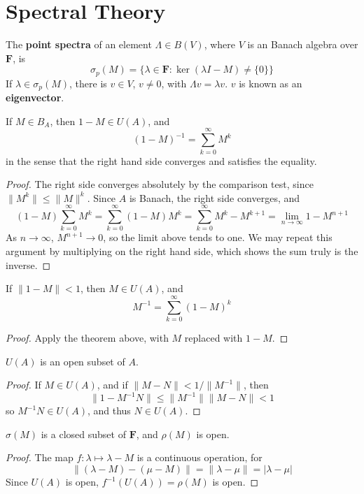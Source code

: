 \section{Spectral Theory}

\begin{definition}
    The {\bf point spectra} of an element $\Lambda \in B(V)$, where $V$ is an Banach algebra over $\mathbf{F}$, is
    \[ \sigma_p(M) = \{ \lambda \in \mathbf{F} : \ker(\lambda I - M) \neq \{ 0 \} \} \]
    If $\lambda \in \sigma_p(M)$, there is $v \in V$, $v \neq 0$, with $\Lambda v = \lambda v$. $v$ is known as an {\bf eigenvector}.
\end{definition}

\begin{lemma}
    If $M \in B_{A}$, then $1 - M \in U(A)$, and
    \[ (1 - M)^{-1} = \sum_{k = 0}^\infty M^k \]
    in the sense that the right hand side converges and satisfies the equality.
\end{lemma}
\begin{proof}
    The right side converges absolutely by the comparison test, since $\| M^k \| \leq \| M \|^k$. Since $A$ is Banach, the right side converges, and
    \[ (1 - M) \sum_{k = 0}^\infty M^k = \sum_{k = 0}^\infty (1 - M)M^k = \sum_{k = 0}^\infty M^k - M^{k+1} = \lim_{n \to \infty} 1 - M^{n+1} \]
    As $n \to \infty$, $M^{n+1} \to 0$, so the limit above tends to one. We may repeat this argument by multiplying on the right hand side, which shows the sum truly is the inverse.
\end{proof}

\begin{corollary}
    If $\| 1 - M \| < 1$, then $M \in U(A)$, and
    \[ M^{-1} = \sum_{k = 0}^\infty (1 - M)^k \]
\end{corollary}
\begin{proof}
    Apply the theorem above, with $M$ replaced with $1 - M$.
\end{proof}

\begin{corollary}
    $U(A)$ is an open subset of $A$.
\end{corollary}
\begin{proof}
    If $M \in U(A)$, and if $\| M - N \| < 1/\| M^{-1} \|$, then 
    \[ \| 1 - M^{-1}N \| \leq \| M^{-1} \| \| M - N \|  < 1 \]
    so $M^{-1}N \in U(A)$, and thus $N \in U(A)$.
\end{proof}

\begin{corollary}
    $\sigma(M)$ is a closed subset of $\mathbf{F}$, and $\rho(M)$ is open.
\end{corollary}
\begin{proof}
    The map $f: \lambda \mapsto \lambda - M$ is a continuous operation, for
    \[ \| (\lambda - M) - (\mu - M) \| = \| \lambda - \mu \| = | \lambda - \mu | \]
    Since $U(A)$ is open, $f^{-1}(U(A)) = \rho(M)$ is open.
\end{proof}

